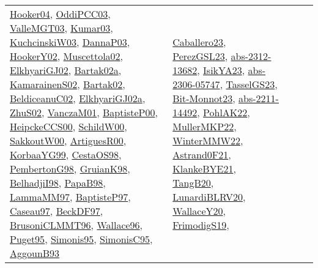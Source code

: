 {\begin{longtable}{lp{3cm}>{\raggedright}p{6cm}>{\raggedright}p{6cm}p{8cm}}
\href{papers/Hooker04.pdf}{Hooker04}\cite{Hooker04}, \href{papers/OddiPCC03.pdf}{OddiPCC03}\cite{OddiPCC03}, \href{papers/ValleMGT03.pdf}{ValleMGT03}\cite{ValleMGT03}, \href{papers/Kumar03.pdf}{Kumar03}\cite{Kumar03}, \href{articles/KuchcinskiW03.pdf}{KuchcinskiW03}\cite{KuchcinskiW03}, \href{papers/DannaP03.pdf}{DannaP03}\cite{DannaP03}, \href{papers/HookerY02.pdf}{HookerY02}\cite{HookerY02}, \href{papers/Muscettola02.pdf}{Muscettola02}\cite{Muscettola02}, \href{papers/ElkhyariGJ02.pdf}{ElkhyariGJ02}\cite{ElkhyariGJ02}, \href{papers/Bartak02a.pdf}{Bartak02a}\cite{Bartak02a}, \href{papers/KamarainenS02.pdf}{KamarainenS02}\cite{KamarainenS02}, \href{papers/Bartak02.pdf}{Bartak02}\cite{Bartak02}, \href{papers/BeldiceanuC02.pdf}{BeldiceanuC02}\cite{BeldiceanuC02}, \href{papers/ElkhyariGJ02a.pdf}{ElkhyariGJ02a}\cite{ElkhyariGJ02a}, \href{papers/ZhuS02.pdf}{ZhuS02}\cite{ZhuS02}, \href{papers/VanczaM01.pdf}{VanczaM01}\cite{VanczaM01}, \href{articles/BaptisteP00.pdf}{BaptisteP00}\cite{BaptisteP00}, \href{articles/HeipckeCCS00.pdf}{HeipckeCCS00}\cite{HeipckeCCS00}, \href{articles/SchildW00.pdf}{SchildW00}\cite{SchildW00}, \href{articles/SakkoutW00.pdf}{SakkoutW00}\cite{SakkoutW00}, \href{articles/ArtiguesR00.pdf}{ArtiguesR00}\cite{ArtiguesR00}, \href{papers/KorbaaYG99.pdf}{KorbaaYG99}\cite{KorbaaYG99}, \href{papers/CestaOS98.pdf}{CestaOS98}\cite{CestaOS98}, \href{papers/PembertonG98.pdf}{PembertonG98}\cite{PembertonG98}, \href{papers/GruianK98.pdf}{GruianK98}\cite{GruianK98}, \href{articles/BelhadjiI98.pdf}{BelhadjiI98}\cite{BelhadjiI98}, \href{articles/PapaB98.pdf}{PapaB98}\cite{PapaB98}, \href{articles/LammaMM97.pdf}{LammaMM97}\cite{LammaMM97}, \href{papers/BaptisteP97.pdf}{BaptisteP97}\cite{BaptisteP97}, \href{papers/Caseau97.pdf}{Caseau97}\cite{Caseau97}, \href{papers/BeckDF97.pdf}{BeckDF97}\cite{BeckDF97}, \href{papers/BrusoniCLMMT96.pdf}{BrusoniCLMMT96}\cite{BrusoniCLMMT96}, \href{articles/Wallace96.pdf}{Wallace96}\cite{Wallace96}, \href{papers/Puget95.pdf}{Puget95}\cite{Puget95}, \href{papers/Simonis95.pdf}{Simonis95}\cite{Simonis95}, \href{papers/SimonisC95.pdf}{SimonisC95}\cite{SimonisC95}, \href{articles/AggounB93.pdf}{AggounB93}\cite{AggounB93} & \href{articles/Caballero23.pdf}{Caballero23}\cite{Caballero23}, \href{papers/PerezGSL23.pdf}{PerezGSL23}\cite{PerezGSL23}, \href{articles/abs-2312-13682.pdf}{abs-2312-13682}\cite{abs-2312-13682}, \href{articles/IsikYA23.pdf}{IsikYA23}\cite{IsikYA23}, \href{articles/abs-2306-05747.pdf}{abs-2306-05747}\cite{abs-2306-05747}, \href{papers/TasselGS23.pdf}{TasselGS23}\cite{TasselGS23}, \href{papers/Bit-Monnot23.pdf}{Bit-Monnot23}\cite{Bit-Monnot23}, \href{articles/abs-2211-14492.pdf}{abs-2211-14492}\cite{abs-2211-14492}, \href{articles/PohlAK22.pdf}{PohlAK22}\cite{PohlAK22}, \href{articles/MullerMKP22.pdf}{MullerMKP22}\cite{MullerMKP22}, \href{papers/WinterMMW22.pdf}{WinterMMW22}\cite{WinterMMW22}, \href{papers/Astrand0F21.pdf}{Astrand0F21}\cite{Astrand0F21}, \href{papers/KlankeBYE21.pdf}{KlankeBYE21}\cite{KlankeBYE21}, \href{papers/TangB20.pdf}{TangB20}\cite{TangB20}, \href{articles/LunardiBLRV20.pdf}{LunardiBLRV20}\cite{LunardiBLRV20}, \href{articles/WallaceY20.pdf}{WallaceY20}\cite{WallaceY20}, \href{papers/FrimodigS19.pdf}{FrimodigS19}\cite{FrimodigS19}, 
\end{longtable}}
